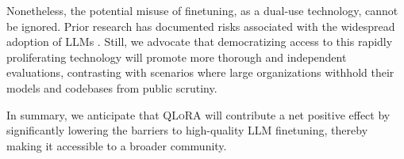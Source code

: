 Nonetheless, the potential misuse of finetuning, as a dual-use technology, cannot be ignored. Prior research has documented risks associated with the widespread adoption of LLMs \citep{bommasani2021opportunities,bender2021dangers}. Still, we advocate that democratizing access to this rapidly proliferating technology will promote more thorough and independent evaluations, contrasting with scenarios where large organizations withhold their models and codebases from public scrutiny.

In summary, we anticipate that \textsc{QLoRA} will contribute a net positive effect by significantly lowering the barriers to high-quality LLM finetuning, thereby making it accessible to a broader community.